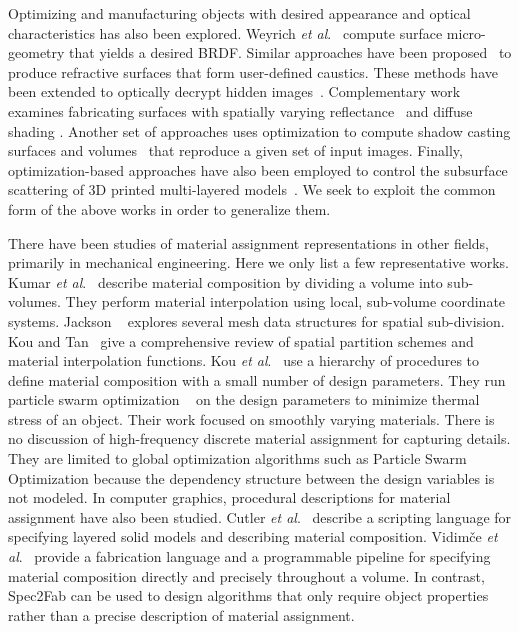 Optimizing and manufacturing objects with desired appearance and optical characteristics has also been explored. Weyrich \textit{et al}.~ compute surface micro-geometry that yields a desired BRDF. Similar approaches have been proposed~\cite{Finckh:2010,Marios:2011} to produce refractive surfaces that form user-defined caustics. These methods have been extended to optically decrypt hidden images~\cite{Papas:2012}. Complementary work examines fabricating surfaces with spatially varying reflectance~\cite{Matusik:2009:PSR,Malzbender:2012:PRF} and diffuse shading \cite{Alexa:2010:RAI}. Another set of approaches uses optimization to compute shadow casting surfaces and volumes~\cite{Mitra:2009:SA,Bermano:2012,Baran:2012:MLA} that reproduce a given set of input images. Finally, optimization-based approaches have also been employed to control the subsurface scattering of 3D printed multi-layered models~\cite{Dong:2010:FSS,Hasan:2010:PRO}. We seek to exploit the common form of the above works in order to generalize them. 

There have been studies of material assignment representations in other fields, primarily in mechanical engineering. 
Here we only list a few representative works. Kumar \textit{et al}.~ describe material composition by dividing a volume into sub-volumes. They perform material interpolation  using local, sub-volume coordinate systems. 
Jackson ~ explores several mesh data structures for spatial sub-division. Kou and Tan~ give a comprehensive review of spatial partition schemes and material interpolation functions. Kou \textit{et al}.~ use a hierarchy of procedures to define material composition with a small number of design parameters. They run particle swarm optimization ~\cite{kennedy1995} on the design parameters to minimize thermal stress of an object. Their work focused on smoothly varying materials. There is no discussion of high-frequency discrete material assignment for capturing details. They are limited to global optimization algorithms such as Particle Swarm Optimization because the dependency structure between the design variables is not modeled.
In computer graphics, procedural descriptions for material assignment have also been studied.
Cutler \textit{et al}.~ describe a scripting language for specifying layered solid models and describing material composition. Vidim\v{c}e \textit{et al}.~ provide a fabrication language and a programmable pipeline for specifying material composition directly and precisely throughout a volume. In contrast, Spec2Fab can be used to design algorithms that only require object properties rather than a precise description of material assignment.

